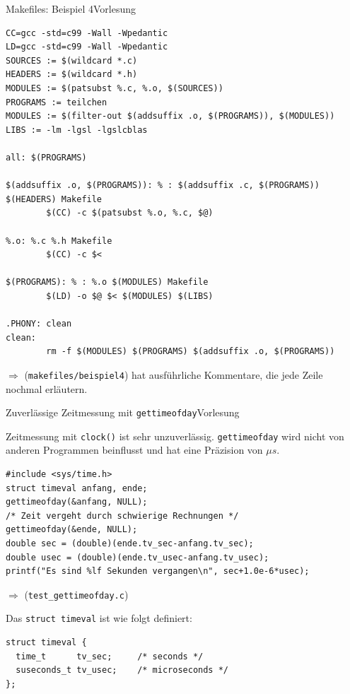 \documentclass[xcolor=dvipsnames]{beamer}
\newcounter{lecturecounter}
\begin{document}
\begin{frame}[fragile]{Makefiles: Beispiel 4}{Vorlesung }
\begin{lstlisting}[basicstyle=\ttfamily\tiny]
CC=gcc -std=c99 -Wall -Wpedantic
LD=gcc -std=c99 -Wall -Wpedantic
SOURCES := $(wildcard *.c)
HEADERS := $(wildcard *.h)
MODULES := $(patsubst %.c, %.o, $(SOURCES))
PROGRAMS := teilchen
MODULES := $(filter-out $(addsuffix .o, $(PROGRAMS)), $(MODULES))
LIBS := -lm -lgsl -lgslcblas

all: $(PROGRAMS)

$(addsuffix .o, $(PROGRAMS)): % : $(addsuffix .c, $(PROGRAMS)) $(HEADERS) Makefile
        $(CC) -c $(patsubst %.o, %.c, $@)

%.o: %.c %.h Makefile
        $(CC) -c $<

$(PROGRAMS): % : %.o $(MODULES) Makefile
        $(LD) -o $@ $< $(MODULES) $(LIBS)

.PHONY: clean
clean:
        rm -f $(MODULES) $(PROGRAMS) $(addsuffix .o, $(PROGRAMS))
\end{lstlisting}
$\Rightarrow$ (\verb|makefiles/beispiel4|) hat ausführliche Kommentare, die jede Zeile nochmal erläutern.
\end{frame}

\begin{frame}[fragile]{Zuverlässige Zeitmessung mit \texttt{gettimeofday}}{Vorlesung }
\begin{block}{}
Zeitmessung mit \verb|clock()| ist sehr unzuverlässig. \verb|gettimeofday| wird nicht von anderen Programmen beinflusst und hat eine Präzision von $\mu s$.
\end{block}
\begin{lstlisting}
#include <sys/time.h>
struct timeval anfang, ende;
gettimeofday(&anfang, NULL);
/* Zeit vergeht durch schwierige Rechnungen */
gettimeofday(&ende, NULL);
double sec = (double)(ende.tv_sec-anfang.tv_sec);
double usec = (double)(ende.tv_usec-anfang.tv_usec);
printf("Es sind %lf Sekunden vergangen\n", sec+1.0e-6*usec);
\end{lstlisting}
$\Rightarrow$ (\verb|test_gettimeofday.c|)
\begin{block}{}
  Das \verb|struct timeval| ist wie folgt definiert:
\end{block}
\begin{lstlisting}
struct timeval {
  time_t      tv_sec;     /* seconds */
  suseconds_t tv_usec;    /* microseconds */
};
\end{lstlisting}
\end{frame}
\end{document}
